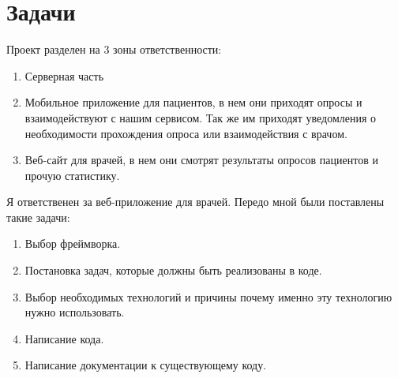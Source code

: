 \section{Задачи}\label{sec:2}
Проект разделен на 3 зоны ответственности:
\begin{enumerate}
    \item Серверная часть
    \item Мобильное приложение для пациентов, в нем они приходят опросы и взаимодействуют с нашим сервисом.
    Так же им приходят уведомления о необходимости прохождения опроса или взаимодействия с врачом.
    \item Веб-сайт для врачей, в нем они смотрят результаты опросов пациентов и прочую статистику.
\end{enumerate}
Я ответственен за веб-приложение для врачей.
Передо мной были поставлены такие задачи:


\begin{enumerate}
    \item Выбор фреймворка.
    \item Постановка задач, которые должны быть реализованы в коде.
    \item Выбор необходимых технологий и причины почему именно эту технологию нужно использовать.
    \item Написание кода.
    \item Написание документации к существующему коду.
\end{enumerate}